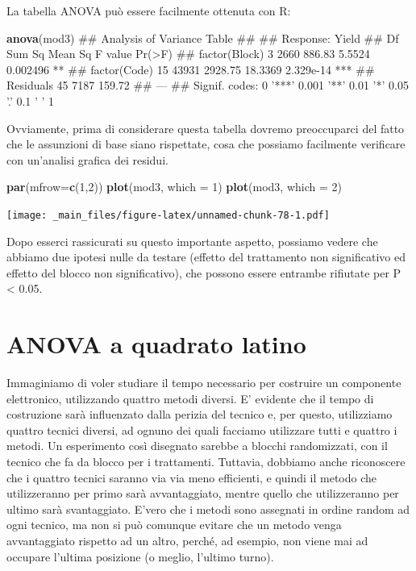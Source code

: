 \documentclass[a4paper,12pt,oneside]{book}
\newenvironment{Shaded}{\begin{snugshade}}{\end{snugshade}}
\newcommand{\KeywordTok}[1]{\textcolor[rgb]{0.13,0.29,0.53}{\textbf{#1}}}
\newcommand{\DataTypeTok}[1]{\textcolor[rgb]{0.13,0.29,0.53}{#1}}
\newcommand{\DecValTok}[1]{\textcolor[rgb]{0.00,0.00,0.81}{#1}}
\newcommand{\NormalTok}[1]{#1}
\theoremstyle{definition}
\theoremstyle{definition}
\theoremstyle{definition}
\theoremstyle{remark}
\begin{document}
La tabella ANOVA può essere facilmente ottenuta con R:

\begin{Shaded}
\begin{Highlighting}[]
\KeywordTok{anova}\NormalTok{(mod3)}
\NormalTok{## Analysis of Variance Table}
\NormalTok{## }
\NormalTok{## Response: Yield}
\NormalTok{##               Df Sum Sq Mean Sq F value    Pr(>F)    }
\NormalTok{## factor(Block)  3   2660  886.83  5.5524  0.002496 ** }
\NormalTok{## factor(Code)  15  43931 2928.75 18.3369 2.329e-14 ***}
\NormalTok{## Residuals     45   7187  159.72                      }
\NormalTok{## ---}
\NormalTok{## Signif. codes:  0 '***' 0.001 '**' 0.01 '*' 0.05 '.' 0.1 ' ' 1}
\end{Highlighting}
\end{Shaded}

Ovviamente, prima di considerare questa tabella dovremo preoccuparci del
fatto che le assunzioni di base siano rispettate, cosa che possiamo
facilmente verificare con un'analisi grafica dei residui.

\begin{Shaded}
\begin{Highlighting}[]
\KeywordTok{par}\NormalTok{(}\DataTypeTok{mfrow=}\KeywordTok{c}\NormalTok{(}\DecValTok{1}\NormalTok{,}\DecValTok{2}\NormalTok{))}
\KeywordTok{plot}\NormalTok{(mod3, }\DataTypeTok{which =} \DecValTok{1}\NormalTok{)}
\KeywordTok{plot}\NormalTok{(mod3, }\DataTypeTok{which =} \DecValTok{2}\NormalTok{)}
\end{Highlighting}
\end{Shaded}

\texttt{[image: \_main\_files/figure-latex/unnamed-chunk-78-1.pdf]}

Dopo esserci rassicurati su questo importante aspetto, possiamo vedere
che abbiamo due ipotesi nulle da testare (effetto del trattamento non
significativo ed effetto del blocco non significativo), che possono
essere entrambe rifiutate per P \textless{} 0.05.

\section{ANOVA a quadrato latino}\label{anova-a-quadrato-latino}

Immaginiamo di voler studiare il tempo necessario per costruire un
componente elettronico, utilizzando quattro metodi diversi. E' evidente
che il tempo di costruzione sarà influenzato dalla perizia del tecnico
e, per questo, utilizziamo quattro tecnici diversi, ad ognuno dei quali
facciamo utilizzare tutti e quattro i metodi. Un esperimento così
disegnato sarebbe a blocchi randomizzati, con il tecnico che fa da
blocco per i trattamenti. Tuttavia, dobbiamo anche riconoscere che i
quattro tecnici saranno via via meno efficienti, e quindi il metodo che
utilizzeranno per primo sarà avvantaggiato, mentre quello che
utilizzeranno per ultimo sarà svantaggiato. E'vero che i metodi sono
assegnati in ordine random ad ogni tecnico, ma non si può comunque
evitare che un metodo venga avvantaggiato rispetto ad un altro, perché,
ad esempio, non viene mai ad occupare l'ultima posizione (o meglio,
l'ultimo turno).
\end{document}

